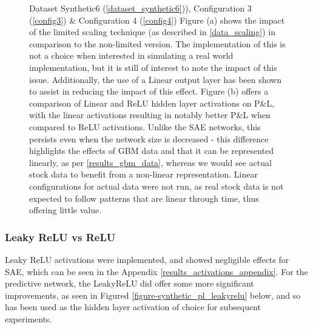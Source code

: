 \documentclass[a4paper,11pt,oneside]{article}
\theoremstyle{plain}
\theoremstyle{definition}
\begin{document}
\begin{figure}[H]
\begin{subfigure}{.5\textwidth}
		\label{figure-synth_pl_hidden}
	\end{subfigure}
	\caption[P\&L by Scaling and Activations (Synthetic Data)]{Dataset Synthetic6  (\ref{dataset_synthetic6})), Configuration 3 (\ref{config3}) \& Configuration 4 (\ref{config4})
		\newline Figure (a) shows the impact of the limited scaling technique (as described in \ref{data_scaling}) in comparison to the non-limited version. The implementation of this is not a choice when interested in simulating a real world implementation, but it is still of interest to note the impact of this issue. Additionally, the use of a Linear output layer has been shown to assist in reducing the impact of this effect.
		\newline Figure (b) offers a comparison of Linear and ReLU hidden layer activations on P\&L, with the linear activations resulting in notably better P\&L when compared to ReLU activations. Unlike the SAE networks, this persists even when the network size is decreased - this difference highlights the effects of GBM data and that it can be represented linearly, as per \ref{results_gbm_data}, whereas we would see actual stock data to benefit from a non-linear representation. Linear configurations for actual data were not run, as real stock data is not expected to follow patterns that are linear through time, thus offering little value.}
	\label{figure-pl_activations_scaling}
\end{figure}



\subsubsection{Leaky ReLU vs ReLU}

Leaky ReLU activations were implemented, and showed negligible effects for SAE, which can be seen in the Appendix \ref{results_activations_appendix}. For the predictive network, the LeakyReLU did offer some more significant improvements, as seen in Figured \ref{figure-synthetic_pl_leakyrelu} below, and so has been used as the hidden layer activation of choice for subsequent experiments.
\end{document}
